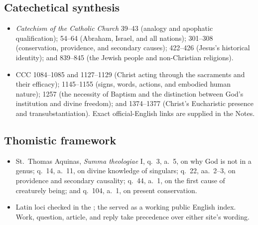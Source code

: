 \subsection*{Catechetical synthesis}

{\fontsize{8.6}{9.6}\selectfont
\begin{itemize}[itemsep=0pt,parsep=0pt,topsep=0.05em]
\item \emph{Catechism of the Catholic Church} 39--43 (analogy and apophatic qualification); 54--64 (Abraham, Israel, and all nations); 301--308 (conservation, providence, and secondary causes); 422--426 (Jesus's historical identity); and 839--845 (the Jewish people and non-Christian religions).
\item CCC 1084--1085 and 1127--1129 (Christ acting through the sacraments and their efficacy); 1145--1155 (signs, words, actions, and embodied human nature); 1257 (the necessity of Baptism and the distinction between God's institution and divine freedom); and 1374--1377 (Christ's Eucharistic presence and transubstantiation). Exact official-English links are supplied in the Notes.
\end{itemize}}

\subsection*{Thomistic framework}

{\fontsize{8.6}{9.6}\selectfont
\begin{itemize}[itemsep=0pt,parsep=0pt,topsep=0.05em]
\item St.~Thomas Aquinas, \emph{Summa theologiae} I, q.~3, a.~5, on why God is not in a genus; q.~14, a.~11, on divine knowledge of singulars; q.~22, aa.~2--3, on providence and secondary causality; q.~44, a.~1, on the first cause of creaturely being; and q.~104, a.~1, on present conservation.
\item Latin loci checked in the ; the  served as a working public English index. Work, question, article, and reply take precedence over either site's wording.
\end{itemize}}

\endgroup
